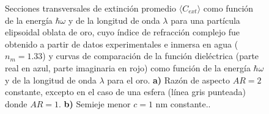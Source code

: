 \begin{figure}[H]
	\quad%
	\caption{Secciones transversales de extinción promedio $\langle C_{ext}\rangle$ como función de la energía $\hbar\omega$ y de la longitud de onda $\lambda$ para una partícula elipsoidal oblata de oro, cuyo índice de refracción complejo fue obtenido a partir de datos experimentales  e inmersa en agua ($n_m=1.33$) y curvas de comparación de la función dieléctrica (parte real en azul, parte imaginaria en rojo) como función de la energía $\hbar\omega$ y de la longitud de onda $\lambda$ para el oro. \textbf{a)} Razón de aspecto $AR=2$ constante, excepto en el caso de una esfera (línea gris punteada) donde $AR=1$. \textbf{b)} Semieje menor $c=1$ nm constante..}\label{fig:test}
\end{figure}

